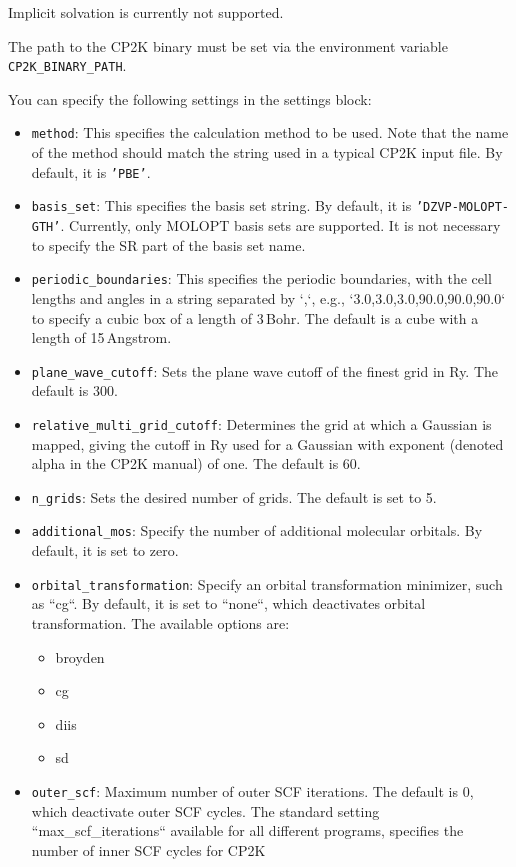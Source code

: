 \documentclass[]{tufte-book}
\begin{document}
Implicit solvation is currently not supported.

The path to the \textsc{CP2K} binary must be set via the environment variable \texttt{CP2K\_BINARY\_PATH}.

You can specify the following settings in the settings block:
\begin{itemize}
	\item \texttt{method}: This specifies the calculation method to be used.
	Note that the name of the method should match the string used in a typical \textsc{CP2K} input file.
	By default, it is \texttt{'PBE'}.
	\item \texttt{basis\_set}: This specifies the basis set string. By default, it is \texttt{'DZVP-MOLOPT-GTH'}. Currently, only MOLOPT basis sets are supported. It is not necessary to specify the SR part of the basis set name.
	\item \texttt{periodic\_boundaries}: This specifies the periodic boundaries, with the cell lengths and angles in a string separated by `,`, e.g., `3.0,3.0,3.0,90.0,90.0,90.0` to specify a cubic box of a length of 3\,Bohr. The default is a cube with a length of 15\,Angstrom.
	\item \texttt{plane\_wave\_cutoff}: Sets the plane wave cutoff of the finest grid in Ry. The default is 300.
	\item \texttt{relative\_multi\_grid\_cutoff}: Determines the grid at which a Gaussian is mapped, giving the cutoff in Ry used for a Gaussian with exponent (denoted alpha in the \textsc{CP2K} manual) of one. The default is 60.
	\item \texttt{n\_grids}: Sets the desired number of grids. The default is set to 5.
	\item \texttt{additional\_mos}: Specify the number of additional molecular orbitals. By default, it is set to zero.
	\item \texttt{orbital\_transformation}: Specify an orbital transformation minimizer, such as ``cg``. By default, it is set to ``none``, which deactivates orbital transformation. The available options are:
        \begin{itemize}
		\item broyden
		\item cg
		\item diis
		\item sd
        \end{itemize}
	\item \texttt{outer\_scf}: Maximum number of outer SCF iterations. The default is 0, which deactivate outer SCF cycles. The standard setting ``max\_scf\_iterations`` available for all different programs, specifies the number of inner SCF cycles for \textsc{CP2K}

\end{itemize}
\end{document}

